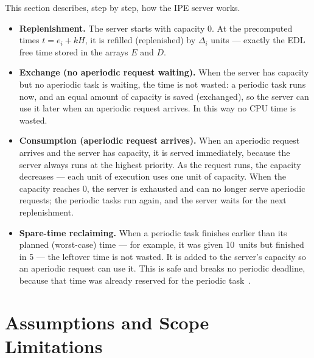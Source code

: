 \documentclass[conference]{IEEEtran}
\begin{document}
This section describes, step by step, how the IPE server works.

\begin{itemize}
  \item \textbf{Replenishment.} The server starts with capacity $0$. At the
        precomputed times $t = e_i + kH$, it is refilled (replenished) by
        $\Delta_i$ units --- exactly the EDL free time stored in the arrays
        $E$ and $D$.
  \item \textbf{Exchange (no aperiodic request waiting).} When the server has
        capacity but no aperiodic task is waiting, the time is not wasted: a
        periodic task runs now, and an equal amount of capacity is saved
        (exchanged), so the server can use it later when an aperiodic request
        arrives. In this way no CPU time is wasted.
  \item \textbf{Consumption (aperiodic request arrives).} When an aperiodic
        request arrives and the server has capacity, it is served immediately,
        because the server always runs at the highest priority. As the request
        runs, the capacity decreases --- each unit of execution uses one unit
        of capacity. When the capacity reaches $0$, the server is exhausted
        and can no longer serve aperiodic requests; the periodic tasks run
        again, and the server waits for the next replenishment.
  \item \textbf{Spare-time reclaiming.} When a periodic task finishes earlier
        than its planned (worst-case) time --- for example, it was given
        10~units but finished in 5 --- the leftover time is not wasted. It is
        added to the server's capacity so an aperiodic request can use it.
        This is safe and breaks no periodic deadline, because that time was
        already reserved for the periodic task~\cite{buttazzo}.
\end{itemize}

\section{Assumptions and Scope Limitations}
\end{document}
